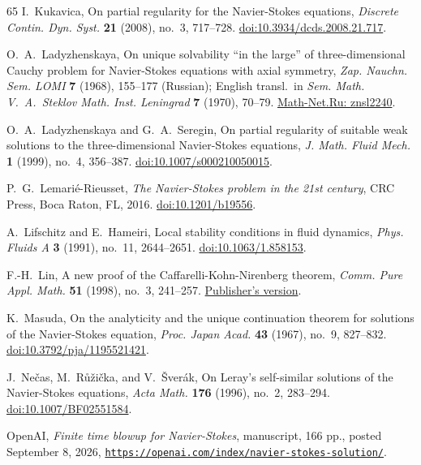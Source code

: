 \documentclass[11pt,reqno]{amsproc}
\numberwithin{equation}{section}
\theoremstyle{remark}
\begin{document}
\begin{thebibliography}{65}
I.~Kukavica,
On partial regularity for the Navier-Stokes equations,
\emph{Discrete Contin. Dyn. Syst.} \textbf{21} (2008), no.~3, 717--728.
\href{https://doi.org/10.3934/dcds.2008.21.717}{doi:10.3934/dcds.2008.21.717}.

O.~A.~Ladyzhenskaya,
On unique solvability ``in the large'' of three-dimensional Cauchy problem
for Navier-Stokes equations with axial symmetry,
\emph{Zap. Nauchn. Sem. LOMI} \textbf{7} (1968), 155--177 (Russian);
English transl.\ in \emph{Sem. Math. V.~A.~Steklov Math. Inst. Leningrad}
\textbf{7} (1970), 70--79.
\href{https://www.mathnet.ru/eng/znsl2240}{Math-Net.Ru: znsl2240}.

O.~A.~Ladyzhenskaya and G.~A.~Seregin,
On partial regularity of suitable weak solutions to the three-dimensional
Navier-Stokes equations,
\emph{J. Math. Fluid Mech.} \textbf{1} (1999), no.~4, 356--387.
\href{https://doi.org/10.1007/s000210050015}{doi:10.1007/s000210050015}.

P.~G.~Lemari\'e-Rieusset,
\emph{The Navier-Stokes problem in the 21st century},
CRC Press, Boca Raton, FL, 2016.
\href{https://doi.org/10.1201/b19556}{doi:10.1201/b19556}.

A.~Lifschitz and E.~Hameiri,
Local stability conditions in fluid dynamics,
\emph{Phys. Fluids A} \textbf{3} (1991), no.~11, 2644--2651.
\href{https://doi.org/10.1063/1.858153}{doi:10.1063/1.858153}.

F.-H.~Lin,
A new proof of the Caffarelli-Kohn-Nirenberg theorem,
\emph{Comm. Pure Appl. Math.} \textbf{51} (1998), no.~3, 241--257.
\href{https://doi.org/10.1002/(SICI)1097-0312(199803)51:3<241::AID-CPA2>3.0.CO;2-A}{Publisher's version}.

K.~Masuda,
On the analyticity and the unique continuation theorem for solutions of the Navier-Stokes equation,
\emph{Proc. Japan Acad.} \textbf{43} (1967), no.~9, 827--832.
\href{https://doi.org/10.3792/pja/1195521421}{doi:10.3792/pja/1195521421}.

J.~Ne\v{c}as, M.~R\r{u}\v{z}i\v{c}ka, and V.~\v{S}ver\'ak,
On Leray's self-similar solutions of the Navier-Stokes equations,
\emph{Acta Math.} \textbf{176} (1996), no.~2, 283--294.
\href{https://doi.org/10.1007/BF02551584}{doi:10.1007/BF02551584}.

OpenAI,
\emph{Finite time blowup for Navier-Stokes},
manuscript, 166 pp., posted September 8, 2026,
\href{https://openai.com/index/navier-stokes-solution/}{\nolinkurl{https://openai.com/index/navier-stokes-solution/}}.


\end{thebibliography}
\end{document}
